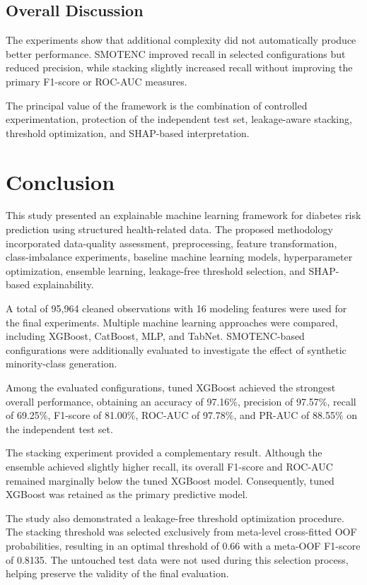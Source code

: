 \documentclass[conference]{IEEEtran}
\begin{document}
\subsection{Overall Discussion}

The experiments show that additional complexity did not automatically produce better performance. SMOTENC improved recall in selected configurations but reduced precision, while stacking slightly increased recall without improving the primary F1-score or ROC-AUC measures.

The principal value of the framework is the combination of controlled experimentation, protection of the independent test set, leakage-aware stacking, threshold optimization, and SHAP-based interpretation.

\section{Conclusion}

This study presented an explainable machine learning framework for diabetes risk prediction using structured health-related data. The proposed methodology incorporated data-quality assessment, preprocessing, feature transformation, class-imbalance experiments, baseline machine learning models, hyperparameter optimization, ensemble learning, leakage-free threshold selection, and SHAP-based explainability.

A total of 95,964 cleaned observations with 16 modeling features were used for the final experiments. Multiple machine learning approaches were compared, including XGBoost, CatBoost, MLP, and TabNet. SMOTENC-based configurations were additionally evaluated to investigate the effect of synthetic minority-class generation.

Among the evaluated configurations, tuned XGBoost achieved the strongest overall performance, obtaining an accuracy of 97.16\%, precision of 97.57\%, recall of 69.25\%, F1-score of 81.00\%, ROC-AUC of 97.78\%, and PR-AUC of 88.55\% on the independent test set.

The stacking experiment provided a complementary result. Although the ensemble achieved slightly higher recall, its overall F1-score and ROC-AUC remained marginally below the tuned XGBoost model. Consequently, tuned XGBoost was retained as the primary predictive model.

The study also demonstrated a leakage-free threshold optimization procedure. The stacking threshold was selected exclusively from meta-level cross-fitted OOF probabilities, resulting in an optimal threshold of 0.66 with a meta-OOF F1-score of 0.8135. The untouched test data were not used during this selection process, helping preserve the validity of the final evaluation.
\end{document}
